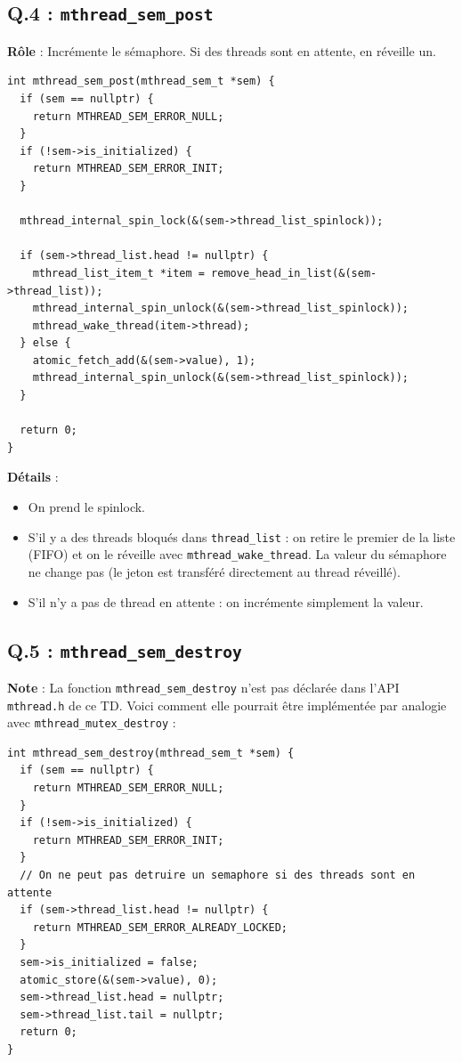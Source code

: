 \documentclass[12pt,a4paper]{article}
\begin{document}
\subsection*{Q.4 : \texttt{mthread\_sem\_post}}

\textbf{Rôle} : Incrémente le sémaphore. Si des threads sont en attente, en réveille un.

\begin{lstlisting}
int mthread_sem_post(mthread_sem_t *sem) {
  if (sem == nullptr) {
    return MTHREAD_SEM_ERROR_NULL;
  }
  if (!sem->is_initialized) {
    return MTHREAD_SEM_ERROR_INIT;
  }

  mthread_internal_spin_lock(&(sem->thread_list_spinlock));

  if (sem->thread_list.head != nullptr) {
    mthread_list_item_t *item = remove_head_in_list(&(sem->thread_list));
    mthread_internal_spin_unlock(&(sem->thread_list_spinlock));
    mthread_wake_thread(item->thread);
  } else {
    atomic_fetch_add(&(sem->value), 1);
    mthread_internal_spin_unlock(&(sem->thread_list_spinlock));
  }

  return 0;
}
\end{lstlisting}

\textbf{Détails} :
\begin{itemize}
  \item On prend le spinlock.
  \item S'il y a des threads bloqués dans \texttt{thread\_list} : on retire le premier de la liste (FIFO) et on le réveille avec \texttt{mthread\_wake\_thread}. La valeur du sémaphore ne change pas (le jeton est transféré directement au thread réveillé).
  \item S'il n'y a pas de thread en attente : on incrémente simplement la valeur.
\end{itemize}

\subsection*{Q.5 : \texttt{mthread\_sem\_destroy}}

\textbf{Note} : La fonction \texttt{mthread\_sem\_destroy} n'est pas déclarée dans l'API \texttt{mthread.h} de ce TD. Voici comment elle pourrait être implémentée par analogie avec \texttt{mthread\_mutex\_destroy} :

\begin{lstlisting}
int mthread_sem_destroy(mthread_sem_t *sem) {
  if (sem == nullptr) {
    return MTHREAD_SEM_ERROR_NULL;
  }
  if (!sem->is_initialized) {
    return MTHREAD_SEM_ERROR_INIT;
  }
  // On ne peut pas detruire un semaphore si des threads sont en attente
  if (sem->thread_list.head != nullptr) {
    return MTHREAD_SEM_ERROR_ALREADY_LOCKED;
  }
  sem->is_initialized = false;
  atomic_store(&(sem->value), 0);
  sem->thread_list.head = nullptr;
  sem->thread_list.tail = nullptr;
  return 0;
}
\end{lstlisting}
\end{document}
